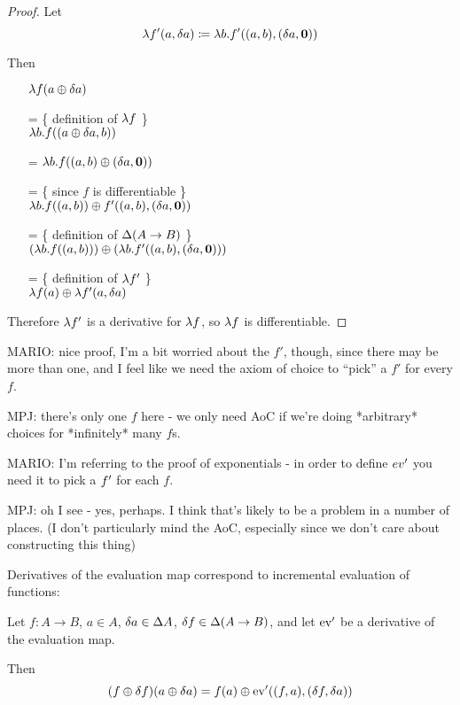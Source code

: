 \begin{proof}
  Let
  $$\lambda f'(a, \delta a) \coloneqq \lambda b. f'((a, b),
  (\delta a, \textbf{0}))$$
  
  Then
  \begin{itemize}
    \item[ ]$\lambda f(a \oplus \delta a)$
    \item[=]\{ definition of $\lambda f$ \}\\
      $\lambda b. f((a \oplus \delta a, b))$
    \item[=] $\lambda b. f((a, b) \oplus (\delta a, \textbf{0}))$
    \item[=]\{ since $f$ is differentiable \}\\
      $\lambda b. f((a, b)) \oplus f'((a, b), (\delta a, \textbf{0}))$
    \item[=]\{ definition of $\Delta (A \rightarrow B)$ \}\\
      $(\lambda b. f((a, b))) \oplus (\lambda b. f'((a, b), (\delta a, \textbf{0})))$
    \item[=]\{ definition of $\lambda f'$ \}\\
      $\lambda f(a) \oplus \lambda f'(a, \delta a)$
  \end{itemize}

  Therefore $\lambda f'$ is a derivative for $\lambda f$, so $\lambda f$
  is differentiable.
\end{proof}
\fi

MARIO: nice proof, I'm a bit worried about the $f'$, though, since there may be more than one,
and I feel like we need the axiom of choice to ``pick'' a $f'$ for every $f$.

MPJ: there's only one $f$ here - we only need AoC if we're doing *arbitrary*
choices for *infinitely* many $f$s.

MARIO: I'm referring to the proof of exponentials - in order to define $ev'$ you
need it to pick a $f'$ for each $f$.

MPJ: oh I see - yes, perhaps. I think that's likely to be a problem in a number
of places. (I don't particularly mind the AoC, especially since we don't care
about constructing this thing)

Derivatives of the evaluation map correspond to incremental evaluation of functions:

\begin{prop}[Incrementalization]
\label{prop:incrementalization}
  Let $f: A \rightarrow B$, $a \in A$, $\delta a \in
  \Delta A$, $\delta f \in \Delta (A \rightarrow B)$, and let
  $\operatorname{ev}'$ be a derivative of the evaluation map.

  Then 
  $$(f \oplus \delta f)(a \oplus \delta a) = f(a) \oplus \operatorname{ev}'((f, a), (\delta f, \delta a))$$
\end{prop}

